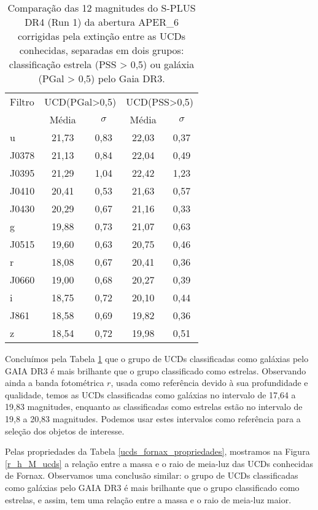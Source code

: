 \begin{table}[!ht]
    \centering
    \caption{Comparação das 12 magnitudes do S-PLUS DR4 (Run 1) da abertura APER\_6 corrigidas pela extinção entre as UCDs conhecidas, separadas em dois grupos: classificação estrela (PSS > 0,5) ou galáxia (PGal > 0,5) pelo Gaia DR3.}   
    \begin{tabular}{lcccc}
        \toprule
        Filtro & \multicolumn{2}{c}{UCD(PGal>0,5)} & \multicolumn{2}{c}{UCD(PSS>0,5)} \\
        & Média & $\sigma$ & Média & $\sigma$ \\
        \midrule
        u & 21,73 & 0,83 & 22,03 & 0,37 \\
        J0378 & 21,13 & 0,84 & 22,04 & 0,49 \\
        J0395 & 21,29 & 1,04 & 22,42 & 1,23 \\
        J0410 & 20,41 & 0,53 & 21,63 & 0,57 \\
        J0430 & 20,29 & 0,67 & 21,16 & 0,33 \\
        g    & 19,88 & 0,73 & 21,07 & 0,63 \\
        J0515 & 19,60 & 0,63 & 20,75 & 0,46 \\
        r    & 18,08 & 0,67 & 20,41 & 0,36 \\
        J0660 & 19,00 & 0,68 & 20,27 & 0,39 \\
        i    & 18,75 & 0,72 & 20,10 & 0,44 \\
        J861 & 18,58 & 0,69 & 19,82 & 0,36 \\
        z    & 18,54 & 0,72 & 19,98 & 0,51 \\
        \bottomrule
    \end{tabular}
    \label{tab_ucds_stars_galaxy_like}
\end{table}

Concluímos pela Tabela \ref{tab_ucds_stars_galaxy_like} que o grupo de UCDs classificadas como galáxias pelo GAIA DR3 é mais brilhante que o grupo classificado como estrelas. Observando ainda a banda fotométrica $r$, usada como referência devido à sua profundidade e qualidade, temos as UCDs classificadas como galáxias no intervalo de 17,64 a 19,83 magnitudes, enquanto as classificadas como estrelas estão no intervalo de 19,8 a 20,83 magnitudes. Podemos usar estes intervalos como referência para a seleção dos objetos de interesse.

Pelas propriedades da Tabela \ref{ucds_fornax_propriedades}, mostramos na Figura \ref{r_h_M_ucds} a relação entre a massa e o raio de meia-luz das UCDs conhecidas de Fornax. Observamos uma conclusão similar: o grupo de UCDs classificadas como galáxias pelo GAIA DR3 é mais brilhante que o grupo classificado como estrelas, e assim, tem uma relação entre a massa e o raio de meia-luz maior.

